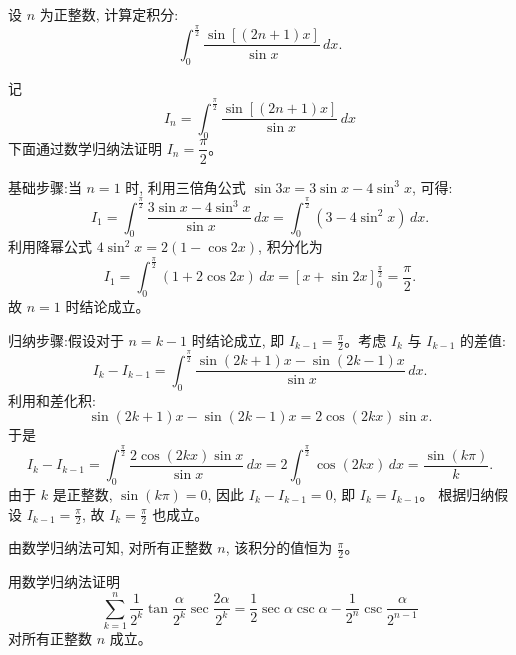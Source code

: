 \begin{questions}
    \question 设 $n$ 为正整数, 计算定积分:
    \[
    \int_{0}^{\frac{\pi}{2}} \frac{\sin [(2n + 1) x]}{\sin x} \,dx.
    \]
    \begin{solution}
        记 
        \[
        I_n = \int_{0}^{\frac{\pi}{2}} \frac{\sin [(2n+1)x]}{\sin x} \,dx
        \]
        下面通过数学归纳法证明 $I_n = \dfrac{\pi}{2}$。

        基础步骤:当 $n=1$ 时, 利用三倍角公式 $\sin 3x = 3\sin x - 4\sin^3 x$, 可得:
        \[
        I_1 = \int_0^{\frac{\pi}{2}} \frac{3\sin x - 4\sin^3 x}{\sin x} \,dx = \int_0^{\frac{\pi}{2}} (3 - 4\sin^2 x) \,dx.
        \]
        利用降幂公式 $4\sin^2 x = 2(1 - \cos 2x)$, 积分化为
        \[
        I_1 = \int_0^{\frac{\pi}{2}} (1 + 2\cos 2x) \,dx = \left[ x + \sin 2x \right]_0^{\frac{\pi}{2}} = \frac{\pi}{2}.
        \]
        故 $n=1$ 时结论成立。

        归纳步骤:假设对于 $n=k-1$ 时结论成立, 即 $I_{k-1} = \frac{\pi}{2}$。考虑 $I_k$ 与 $I_{k-1}$ 的差值:
        \[
        I_k - I_{k-1} = \int_0^{\frac{\pi}{2}} \frac{\sin(2k+1)x - \sin(2k-1)x}{\sin x} \,dx.
        \]
        利用和差化积:
        \[
        \sin(2k+1)x - \sin(2k-1)x = 2\cos(2kx)\sin x.
        \]
        于是
        \[
        I_k - I_{k-1} = \int_0^{\frac{\pi}{2}} \frac{2\cos(2kx)\sin x}{\sin x} \,dx = 2 \int_0^{\frac{\pi}{2}} \cos(2kx) \,dx = \frac{\sin(k\pi)}{k}.
        \]
        由于 $k$ 是正整数, $\sin(k\pi) = 0$, 因此 $I_k - I_{k-1} = 0$, 即 $I_k = I_{k-1}$。
        根据归纳假设 $I_{k-1} = \frac{\pi}{2}$, 故 $I_k = \frac{\pi}{2}$ 也成立。

        由数学归纳法可知, 对所有正整数 $n$, 该积分的值恒为 $\frac{\pi}{2}$。
    \end{solution}

    \question 用数学归纳法证明
\[
\sum_{k=1}^{n} \frac{1}{2^k} \tan \frac{\alpha}{2^k} \sec \frac{2\alpha}{2^k} = \frac{1}{2} \sec \alpha \csc \alpha - \frac{1}{2^n} \csc \frac{\alpha}{2^{n-1}}
\]
对所有正整数 $n$ 成立。


\end{questions}
